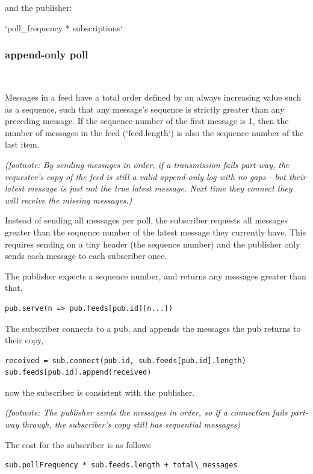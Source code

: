 \documentclass[sigconf]{acmart}
\begin{document}
and the publisher:

`poll\_frequency * subscriptions`

\subsubsection{append-only poll}\ \\ \vspace{-1em}

Messages in a feed have a total order defined by an always increasing
value such as a sequence, such that any message's sequence is strictly
greater than any preceding message. If the sequence number of the
first message is 1, then the number of messages in the feed
(`feed.length`) is also the sequence number of the last item.

{\em (footnote: By sending messages in order, if a transmission fails
  part-way, the requester's copy of the feed is still a valid
  append-only log with no gaps - but their latest message is just not
  the true latest message. Next time they connect they will receive
  the missing messages.)}

Instead of sending all messages per poll, the subscriber requests all
messages greater than the sequence number of the latest message they
currently have.  This requires sending on a tiny header (the sequence
number) and the publisher only sends each message to each subscriber
once.

The publisher expects a sequence number, and returns any messages
greater than that.
\begin{verbatim}
pub.serve(n => pub.feeds[pub.id][n...])
\end{verbatim}

The subscriber connects to a pub, and appends the messages the pub
returns to their copy,

\begin{verbatim}
received = sub.connect(pub.id, sub.feeds[pub.id].length)
sub.feeds[pub.id].append(received)
\end{verbatim}
now the subscriber is consistent with the publisher.

{\em (footnote: The publisher sends the messages in order, so if a
  connection fails part-way through, the subscriber's copy still has
  sequential messages)}

The cost for the subscriber is as follows

\begin{verbatim}
sub.pollFrequency * sub.feeds.length + total\_messages
\end{verbatim}
\end{document}
